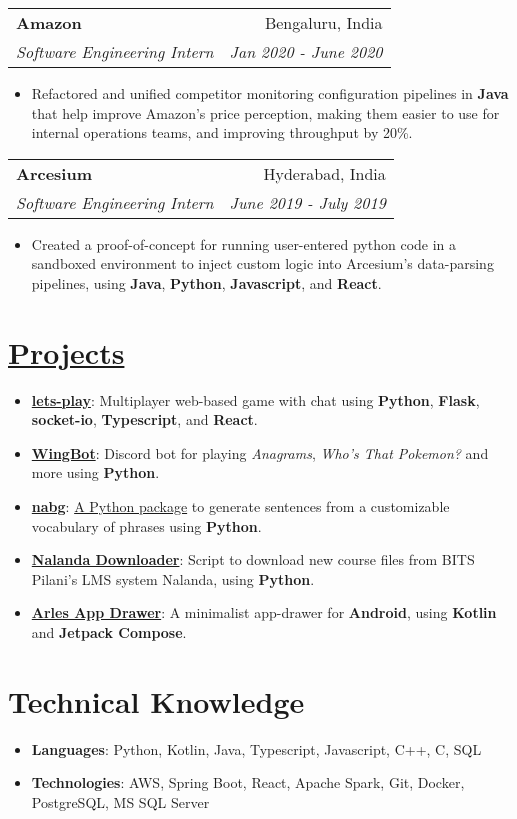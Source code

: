 \documentclass[a4paper,11pt]{article}
\makeatletter
\newcommand{\resumeItem}[2]{
  \item\small{
    \textbf{#1}{: #2 \vspace{-2pt}}
  }
}
\newcommand{\resumeItemNoTitle}[1]{
  \item\small{
    {#1 \vspace{-2pt}}
  }
}
\newcommand{\resumeSubheading}[4]{
  \vspace{2pt}
    \begin{tabular*}{0.97\textwidth}{l@{\extracolsep{\fill}}r}
      \textbf{#1} & #2 \\
      \textit{\small#3} & \textit{\small #4} \\
    \end{tabular*}\vspace{-2pt}
}
\newcommand{\resumeItemListStart}{\begin{itemize}}
\newcommand{\resumeItemListEnd}{\end{itemize}\vspace{-2pt}}
\makeatother
\begin{document}
\resumeSubheading
{Amazon}{Bengaluru, India}
{Software Engineering Intern}{Jan 2020 - June 2020}
\resumeItemListStart
\resumeItemNoTitle{Refactored and unified competitor monitoring configuration pipelines in \textbf{Java} that help improve Amazon's price perception, making them easier to use for internal operations teams, and improving throughput by 20\%.}
\resumeItemListEnd

\resumeSubheading
{Arcesium}{Hyderabad, India}
{Software Engineering Intern}{June 2019 - July 2019}
\resumeItemListStart
\resumeItemNoTitle{Created a proof-of-concept for running user-entered python code in a sandboxed environment to inject custom logic into Arcesium's data-parsing pipelines, using \textbf{Java}, \textbf{Python}, \textbf{Javascript}, and \textbf{React}.}
\resumeItemListEnd


\section{\href{https://naveen-u.github.io/projects/}{Projects}}
\resumeItemListStart
\resumeItem{\href{https://github.com/naveen-u/lets-play}{lets-play}}
{Multiplayer web-based game with chat using \textbf{Python}, \textbf{Flask}, \textbf{socket-io}, \textbf{Typescript}, and \textbf{React}.}
\resumeItem{\href{https://github.com/naveen-u/WingBot}{WingBot}}
{Discord bot for playing \textit{Anagrams}, \textit{Who's That Pokemon?} and more using \textbf{Python}.}
\resumeItem{\href{https://github.com/naveen-u/nabg}{nabg}}
{\href{https://pypi.org/project/nabg/}{A Python package} to generate sentences from a customizable vocabulary of phrases using \textbf{Python}.}
\resumeItem{\href{https://github.com/naveen-u/Nalanda-Downloader}{Nalanda Downloader}}
{Script to download new course files from BITS Pilani's LMS system Nalanda, using \textbf{Python}.}
\resumeItem{\href{https://github.com/naveen-u/arles-app-drawer}{Arles App Drawer}}
{A minimalist app-drawer for \textbf{Android}, using \textbf{Kotlin} and \textbf{Jetpack Compose}.}
\resumeItemListEnd

\section{Technical Knowledge}
\resumeItemListStart
\resumeItem{Languages}{Python, Kotlin, Java, Typescript, Javascript, C++, C, SQL}
\resumeItem{Technologies}{AWS, Spring Boot, React, Apache Spark, Git, Docker, PostgreSQL, MS SQL Server}
\resumeItemListEnd
\end{document}
